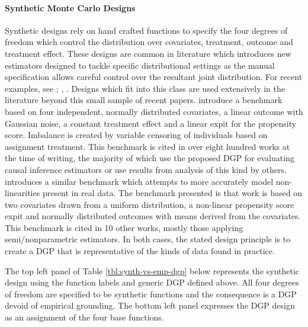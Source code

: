 \documentclass[../main.tex]{subfiles}
\begin{document}
\vspace{\baselineskip}
\paragraph*{Synthetic Monte Carlo Designs}\par


\vspace{\baselineskip}
Synthetic designs rely on hand crafted functions to specify the four degrees of freedom which control the distribution over covariates, treatment, outcome and treatment effect. These designs are common in literature which introduces new estimators designed to tackle specific distributional settings as the manual specification allows careful control over the resultant joint distribution. For recent examples, see \cite{Kunzel2018TransferNetworks}; \cite{Johansson2018LearningDesigns}, \cite{Johansson2016LearningInference}. Designs which fit into this class are used extensively in the literature beyond this small sample of recent papers. \cite{Kang2007Demystifying1} introduce a benchmark based on four independent, normally distributed covariates, a linear outcome with Gaussian noise, a constant treatment effect and a linear expit for the propensity score. Imbalance is created by variable censoring of individuals based on assignment treatment. This benchmark is cited in over eight hundred works at the time of writing, the majority of which use the proposed DGP for evaluating causal inference estimators or use results from analysis of this kind by others. \cite{Kallus2016AInference} introduces a similar benchmark which attempts to more accurately model non-linearities present in real data. The benchmark presented is that work is based on two covariates drawn from a uniform distribution, a non-linear propensity score expit and normally distributed outcomes with means derived from the covariates. This benchmark is cited in 10 other works, mostly those applying semi/nonparametric estimators. In both cases, the stated design principle is to create a DGP that is representative of the kinds of data found in practice.\par


\vspace{\baselineskip}
The top left panel of Table \ref{tbl:synth-vs-emp-dgp} below represents the synthetic design using the function labels and generic DGP defined above. All four degrees of freedom are specified to be synthetic functions and the consequence is a DGP devoid of empirical grounding. The bottom left panel expresses the \cite{Kang2007DemystifyingData} DGP design as an assignment of the four base functions.\par
\end{document}
